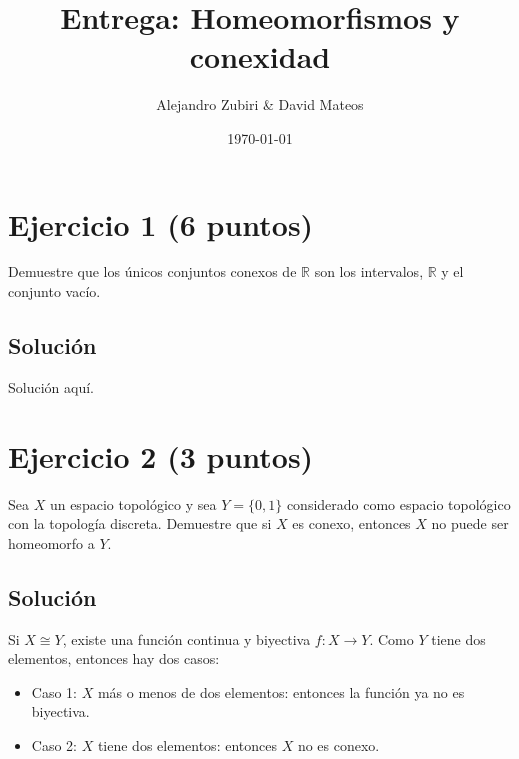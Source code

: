 \documentclass{amsbook}
\author{Alejandro Zubiri \& David Mateos}
\date{\today}
\title{Entrega: Homeomorfismos y conexidad}
\begin{document}
\maketitle
\section{Ejercicio 1 (6 puntos)}
Demuestre que los únicos conjuntos conexos de \(\mathbb{R}\) son los intervalos, \(\mathbb{R}\) y el
conjunto vacío.\\
\subsection{Solución}
Solución aquí.
\section{Ejercicio 2 (3 puntos)}
Sea \(X\) un espacio topológico y sea \(Y = \{ 0,1 \}\) considerado como espacio
topológico con la topología discreta. Demuestre que si \(X\) es conexo, entonces
\(X\) no puede ser homeomorfo a \(Y\).\\
\subsection{Solución}
Si $X \cong Y$, existe una función continua y biyectiva $f: X \to Y$. Como
$Y$ tiene dos elementos, entonces hay dos casos:
\begin{itemize}
	\item Caso 1: $X$ más o menos de dos elementos: entonces la función
		ya no es biyectiva.
	\item Caso 2: $X$ tiene dos elementos: entonces $X$ no es conexo.  
\end{itemize}
\end{document}
